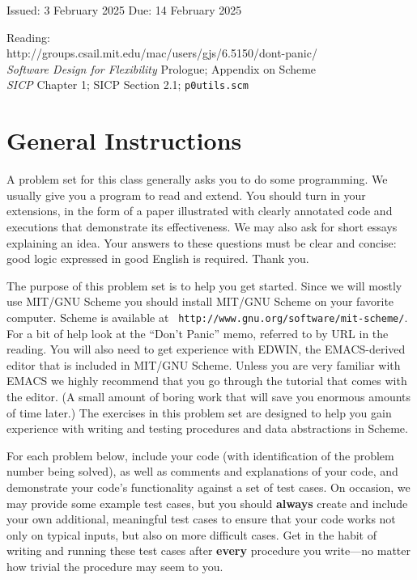 
\def\fbox#1{%
  \vtop{\vbox{\hrule%
              \hbox{\vrule\kern3pt%
                    \vtop{\vbox{\kern3pt#1}\kern3pt}%
                    \kern3pt\vrule}}%
        \hrule}}

\def\emptybox#1#2{\fbox{\vbox to #2{\hbox to #1 {\null}}}}





{Issued: 3 February 2025} \hfill {Due: 14 February 2025}

\noindent
Reading: \\
\noindent
http://groups.csail.mit.edu/mac/users/gjs/6.5150/dont-panic/\\
{\em Software Design for Flexibility} Prologue; Appendix on Scheme\\
{\em SICP} Chapter 1; SICP Section 2.1; {\tt p0utils.scm}

\section*{General Instructions}

A problem set for this class generally asks you to do some
programming.  We usually give you a program to read and extend.  You
should turn in your extensions, in the form of a paper illustrated
with clearly annotated code and executions that demonstrate its
effectiveness.  We may also ask for short essays explaining an idea.
Your answers to these questions must be clear and concise: good logic
expressed in good English is required.  Thank you.

The purpose of this problem set is to help you get started.  Since we
will mostly use MIT/GNU Scheme you should install MIT/GNU Scheme on
your favorite computer.  Scheme is available at {\tt
http://www.gnu.org/software/mit-scheme/}.  For a bit of help look at
the ``Don't Panic'' memo, referred to by URL in the reading.  You will
also need to get experience with EDWIN, the EMACS-derived editor that
is included in MIT/GNU Scheme.  Unless you are very familiar with
EMACS we highly recommend that you go through the tutorial that comes
with the editor.  (A small amount of boring work that will save you
enormous amounts of time later.)  The exercises in this problem set
are designed to help you gain experience with writing and testing
procedures and data abstractions in Scheme.

For each problem below, include your code (with identification of the
problem number being solved), as well as comments and explanations of
your code, and demonstrate your code's functionality against a set of
test cases.  On occasion, we may provide some example test cases, but
you should {\bf always} create and include your own additional,
meaningful test cases to ensure that your code works not only on
typical inputs, but also on more difficult cases.  Get in the habit of
writing and running these test cases after {\bf every} procedure you
write---no matter how trivial the procedure may seem to you.
 
